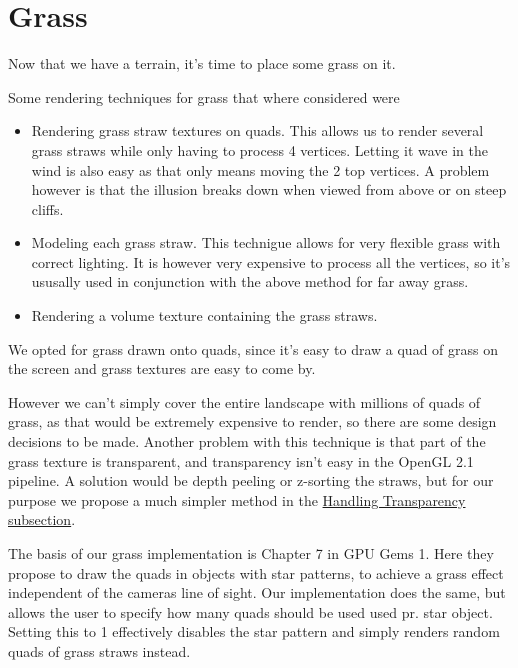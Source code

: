 \chapter{Grass}


Now that we have a terrain, it's time to place some grass on it.

Some rendering techniques for grass that where considered were

\begin{itemize}
\item Rendering grass straw textures on quads. This allows us to
  render several grass straws while only having to process 4
  vertices. Letting it wave in the wind is also easy as that only
  means moving the 2 top vertices. A problem however is that the
  illusion breaks down when viewed from above or on steep cliffs.
\item Modeling each grass straw. This technigue allows for very
  flexible grass with correct lighting. It is however very expensive
  to process all the vertices, so it's ususally used in conjunction
  with the above method for far away grass.
\item Rendering a volume texture containing the grass straws.
\end{itemize}

We opted for grass drawn onto quads, since it's easy to draw a quad of
grass on the screen and grass textures are easy to come by.

However we can't simply cover the entire landscape with millions of
quads of grass, as that would be extremely expensive to render, so
there are some design decisions to be made. Another problem with this
technique is that part of the grass texture is transparent, and
transparency isn't easy in the OpenGL 2.1 pipeline. A solution would
be depth peeling or z-sorting the straws, but for our purpose we
propose a much simpler method in the
\hyperref[sec:transparency]{Handling Transparency subsection}.


The basis of our grass implementation is Chapter 7 in GPU Gems 1. Here
they propose to draw the quads in objects with star patterns, to
achieve a grass effect independent of the cameras line of sight. Our
implementation does the same, but allows the user to specify how many
quads should be used used pr. star object. Setting this to 1
effectively disables the star pattern and simply renders random quads
of grass straws instead.

